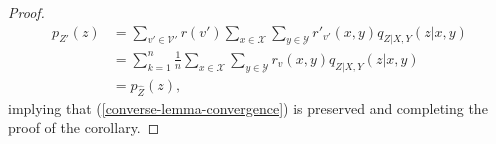 \documentclass[journal]{IEEEtran}
\newcommand{\channelpmf}{q}
\newcommand{\codebookpmf}{p}
\newcommand{\generalpmf}{r}
\newcommand{\channelInOne}{X}
\newcommand{\channelInOneAlph}{\mathcal{X}}
\newcommand{\channelInOneAlphElement}{x}
\newcommand{\channelInTwo}{Y}
\newcommand{\channelInTwoAlph}{\mathcal{Y}}
\newcommand{\channelInTwoAlphElement}{y}
\newcommand{\channelOut}{Z}
\newcommand{\channelOutAlphElement}{z}
\newcommand{\codebookBlocklength}{n}
\newcommand{\blockIndex}{k}
\newcommand{\timeSharingAlph}{\mathcal{V}}
\newcommand{\timeSharingAlphElement}{v}
\begin{document}
\begin{proof}
\begin{align*}
\codebookpmf_{\channelOut'}(\channelOutAlphElement)
&=
\sum\limits_{\timeSharingAlphElement' \in \timeSharingAlph'}
  \generalpmf(\timeSharingAlphElement')
  \sum\limits_{\channelInOneAlphElement \in \channelInOneAlph}
  \sum\limits_{\channelInTwoAlphElement \in \channelInTwoAlph}
    \generalpmf'_{\timeSharingAlphElement'}(\channelInOneAlphElement, \channelInTwoAlphElement)
    \channelpmf_{\channelOut | \channelInOne, \channelInTwo}(\channelOutAlphElement | \channelInOneAlphElement, \channelInTwoAlphElement)
\\
&=
\sum\limits_{\blockIndex=1}^\codebookBlocklength
    \frac{1}{n}
  \sum\limits_{\channelInOneAlphElement \in \channelInOneAlph}
  \sum\limits_{\channelInTwoAlphElement \in \channelInTwoAlph}
    \generalpmf_\timeSharingAlphElement(\channelInOneAlphElement, \channelInTwoAlphElement)
    \channelpmf_{\channelOut | \channelInOne, \channelInTwo}(\channelOutAlphElement | \channelInOneAlphElement, \channelInTwoAlphElement)
\\
&=
\codebookpmf_{\hat{\channelOut}}(\channelOutAlphElement),
\end{align*}
implying that (\ref{converse-lemma-convergence}) is preserved and completing the proof of the corollary.
\end{proof}
\end{document}
